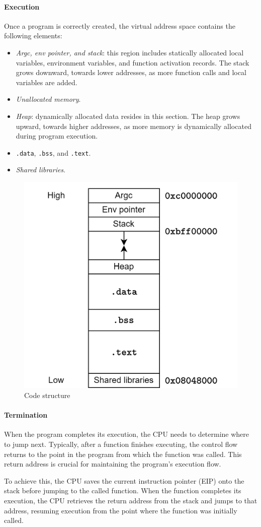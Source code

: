 \paragraph*{Execution}
Once a program is correctly created, the virtual address space contains the following elements:
\begin{itemize}
    \item \textit{Argc, env pointer, and stack}: this region includes statically allocated local variables, environment variables, and function activation records.
        The stack grows downward, towards lower addresses, as more function calls and local variables are added.
    \item \textit{Unallocated memory}.
    \item \textit{Heap}: dynamically allocated data resides in this section. 
        The heap grows upward, towards higher addresses, as more memory is dynamically allocated during program execution.
    \item \texttt{.data}, \texttt{.bss}, and \texttt{.text}. 
    \item \textit{Shared libraries}. 
\end{itemize}
\begin{figure}[H]
    \centering
    \includegraphics[width=0.4\linewidth]{images/stack.png}
    \caption{Code structure}
\end{figure}

\paragraph*{Termination}
When the program completes its execution, the CPU needs to determine where to jump next. 
Typically, after a function finishes executing, the control flow returns to the point in the program from which the function was called. 
This return address is crucial for maintaining the program's execution flow.

To achieve this, the CPU saves the current instruction pointer (EIP) onto the stack before jumping to the called function. 
When the function completes its execution, the CPU retrieves the return address from the stack and jumps to that address, resuming execution from the point where the function was initially called.